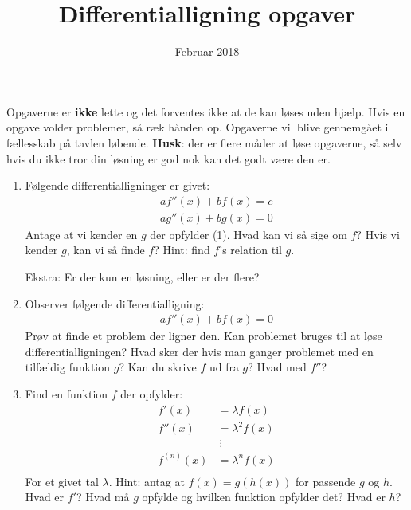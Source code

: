 \documentclass[a4paper]{article}
\title{Differentialligning opgaver}
\date{Februar 2018}
\theoremstyle{plain}
\theoremstyle{definition}
\begin{document}
\maketitle
\begin{large}
Opgaverne er \textbf{ikke} lette og det forventes ikke at de kan l{\o}ses
uden hj{\ae}lp. Hvis en opgave volder problemer, s{\aa} r{\ae}k h{\aa}nden
op. Opgaverne vil blive gennemg{\aa}et i f{\ae}llesskab p{\aa} tavlen
l{\o}bende. \textbf{Husk}: der er flere m{\aa}der at l{\o}se opgaverne,
s{\aa} selv hvis du ikke tror din l{\o}sning er god nok kan det godt
v{\ae}re den er.
\begin{enumerate}
	\item F{\o}lgende differentialligninger er givet:
		\begin{equation}
		\begin{aligned}
			af''(x)+bf(x)=c \\
			ag''(x)+bg(x)=0
		\end{aligned}
		\end{equation}
		Antage at vi kender en $g$ der opfylder (1). Hvad
		kan vi s{\aa} sige om $f$? Hvis vi kender $g$,
		kan vi s{\aa} finde $f$? Hint: find $f$'s relation
		til $g$.

		Ekstra: Er der kun en l{\o}sning, eller er der flere?
	\item Observer f{\o}lgende differentialligning:
		\begin{equation}
		\begin{aligned}
			af''(x)+bf(x)=0
		\end{aligned}
		\end{equation}
		Pr{\o}v at finde et problem der ligner den. Kan problemet
		bruges til at l{\o}se differentialligningen? Hvad sker der
		hvis man ganger problemet med en tilf{\ae}ldig funktion
		$g$? Kan du skrive $f$ ud fra $g$? Hvad med $f''$?
	\item Find en funktion $f$ der opfylder:
		\begin{equation}
		\begin{aligned}
			     f'(x) &= \lambda f(x) \\
			    f''(x) &= \lambda^2 f(x) \\
				  	   &\  \vdots \\
			f^{(n)}(x) &= \lambda^n f(x) \\
		\end{aligned}
		\end{equation}
		For et givet tal $\lambda$. Hint: antag at $f(x)=g(h(x))$
		for passende $g$ og $h$. Hvad er $f'$? Hvad m{\aa} $g$
		opfylde og hvilken funktion opfylder det? Hvad er $h$?


\end{enumerate}
\end{large}
\end{document}
